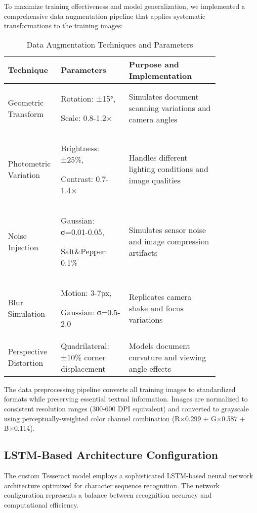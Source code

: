 To maximize training effectiveness and model generalization, we implemented a comprehensive data augmentation pipeline that applies systematic transformations to the training images:

\begin{table}[H]
\centering
\caption{Data Augmentation Techniques and Parameters}
\label{tab:augmentation_techniques}
\begin{tabular}{|>{\centering\arraybackslash}p{0.15\linewidth}|>{\centering\arraybackslash}p{0.3\linewidth}|>{\raggedright\arraybackslash}p{0.4\linewidth}|}
\hline
\textbf{Technique} & \textbf{Parameters} & \textbf{Purpose and Implementation} \\
\hline
Geometric Transform & Rotation: ±15°, 

Scale: 0.8-1.2×& Simulates document scanning variations and camera angles \\
\hline
Photometric Variation & Brightness: ±25\%,

Contrast: 0.7-1.4×& Handles different lighting conditions and image qualities \\
\hline
Noise Injection & Gaussian: σ=0.01-0.05, 

Salt\&Pepper: 0.1\%& Simulates sensor noise and image compression artifacts \\
\hline
Blur Simulation & Motion: 3-7px, 

Gaussian: σ=0.5-2.0& Replicates camera shake and focus variations \\
\hline
Perspective Distortion & Quadrilateral: ±10\% corner displacement & Models document curvature and viewing angle effects \\
\hline
\end{tabular}
\end{table}

The data preprocessing pipeline converts all training images to standardized formats while preserving essential textual information. Images are normalized to consistent resolution ranges (300-600 DPI equivalent) and converted to grayscale using perceptually-weighted color channel combination (R×0.299 + G×0.587 + B×0.114).

\subsection{LSTM-Based Architecture Configuration}

The custom Tesseract model employs a sophisticated LSTM-based neural network architecture optimized for character sequence recognition. The network configuration represents a balance between recognition accuracy and computational efficiency.

